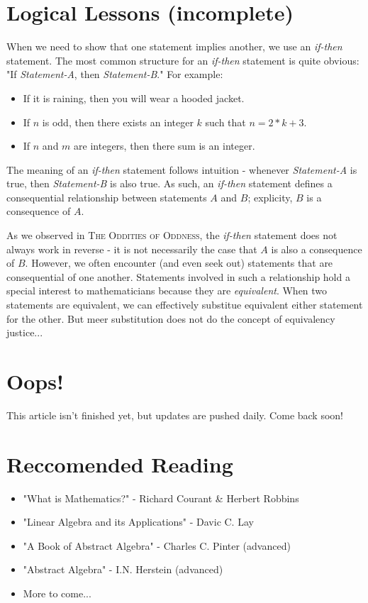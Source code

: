 \documentclass[a4paper,12pt]{article}
\begin{document}
\section{Logical Lessons (incomplete)}
When we need to show that one statement implies another, we use an \textit{if-then} statement. The most common structure for an \textit{if-then} statement is quite obvious: "If \textit{Statement-A}, then \textit{Statement-B}." For example:
\begin{itemize}
\item If it is raining, then you will wear a hooded jacket.
\item If $n$ is odd, then there exists an integer $k$ such that $n = 2*k + 3$.
\item If $n$ and $m$ are integers, then there sum is an integer.
\end{itemize} 
The meaning of an \textit{if-then} statement follows intuition - whenever \textit{Statement-A} is true, then \textit{Statement-B} is also true. As such, an \textit{if-then} statement defines a consequential relationship between statements $A$ and $B$; explicity, $B$ is a consequence of $A$. 

As we observed in \textsc{The Oddities of Oddness}, the \textit{if-then} statement does not always work in reverse - it is not necessarily the case that $A$ is also a consequence of $B$. However, we often encounter (and even seek out) statements that are consequential of one another. Statements involved in such a relationship hold a special interest to mathematicians because they are \textit{equivalent}. When two statements are equivalent, we can effectively substitue equivalent either statement for the other. But meer substitution does not do the concept of equivalency justice...

 
\section{Oops!}
This article isn't finished yet, but updates are pushed daily. Come back soon!

\section{Reccomended Reading}
\begin{itemize}
\item "What is Mathematics?" - Richard Courant \& Herbert Robbins
\item "Linear Algebra and its Applications" - Davic C. Lay
\item "A Book of Abstract Algebra" - Charles C. Pinter (advanced)
\item "Abstract Algebra" - I.N. Herstein (advanced)
\item More to come...
\end{itemize}
\end{document}
